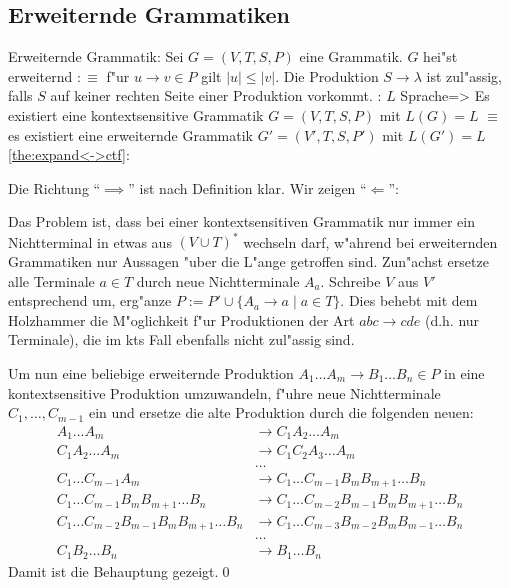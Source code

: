 \subsection{Erweiternde Grammatiken}
 Erweiternde Grammatik:{
  Sei $G=(V,T,S,P)$ eine Grammatik. $G$ hei"st erweiternd $:\equiv$
  f"ur $u\to v\in P$ gilt $|u|\le|v|$. Die Produktion $S\to\lambda$ ist
  zul"assig, falls $S$ auf keiner rechten Seite einer Produktion vorkommt.
  }
\theorem:
  $L$ Sprache=>{
  \label{the:expand<->ctf}
  Es existiert eine kontextsensitive Grammatik $G=(V,T,S,P)$ mit $L(G)=L$ $\equiv$
  es existiert eine erweiternde Grammatik $G'=(V',T,S,P')$ mit $L(G')=L$
  }
\proof \ref{the:expand<->ctf}:{
  Die Richtung ``$\implies$'' ist nach Definition klar. Wir zeigen
  ``$\Leftarrow$'':
  
  Das Problem ist, dass bei einer kontextsensitiven Grammatik nur immer
  ein Nichtterminal in etwas aus $(V\cup T)^*$ wechseln darf, 
  w"ahrend bei erweiternden Grammatiken nur Aussagen "uber die L"ange 
  getroffen sind. Zun"achst ersetze alle Terminale $a\in T$ durch
  neue Nichtterminale $A_a$. Schreibe $V$ aus $V'$ entsprechend um,
  erg"anze $P:=P'\cup\{A_a\to a\mid a\in T\}$. Dies behebt mit dem Holzhammer
  die M"oglichkeit f"ur Produktionen der Art $abc\to cde$ (d.h. nur Terminale), 
  die im kts Fall ebenfalls nicht zul"assig sind.
  
  Um nun eine beliebige erweiternde Produktion
  $A_1\ldots A_m\to B_1\ldots B_n\in P$ in eine kontextsensitive Produktion
  umzuwandeln, f"uhre neue Nichtterminale $C_1,\ldots,C_{m-1}$ ein und
  ersetze die alte Produktion durch die folgenden neuen:
  \begin{align*}
    A_1\ldots A_m &\to C_1A_2\ldots A_m\\
    C_1A_2\ldots A_m &\to C_1C_2A_3\ldots A_m\\
    &\ldots\\
    C_1\ldots C_{m-1}A_m &\to C_1\ldots C_{m-1}B_mB_{m+1}\ldots B_n\\
    C_1\ldots C_{m-1}B_mB_{m+1}\ldots B_n &\to 
      C_1\ldots C_{m-2}B_{m-1}B_mB_{m+1}\ldots B_n\\
    C_1\ldots C_{m-2}B_{m-1}B_mB_{m+1}\ldots B_n &\to 
      C_1\ldots C_{m-3}B_{m-2}B_mB_{m-1}\ldots B_n\\
    &\ldots\\
    C_1B_2\ldots B_n &\to 
      B_1\ldots B_n
    \end{align*}
  Damit ist die Behauptung gezeigt.\qed
  }
